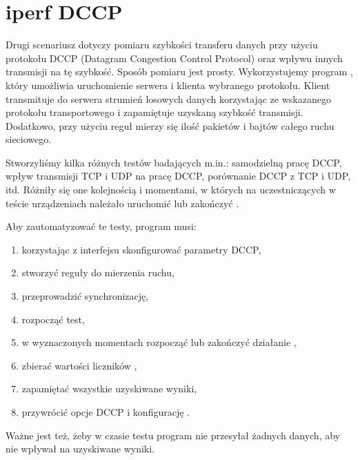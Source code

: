 \documentclass[00-praca-magisterska.tex]{subfiles}
\begin{document}

\section{iperf DCCP}


Drugi scenariusz dotyczy pomiaru szybkości transferu danych przy użyciu
protokołu DCCP (Datagram Congestion Control Protocol) oraz wpływu innych
transmisji na tę szybkość. Sposób pomiaru jest prosty. Wykorzystujemy program
, który umożliwia uruchomienie serwera i klienta wybranego
protokołu. Klient transmituje do serwera strumień losowych danych korzystając
ze wskazanego protokołu transportowego i zapamiętuje uzyskaną szybkość
transmisji. Dodatkowo, przy użyciu reguł  mierzy się ilość
pakietów i bajtów całego ruchu sieciowego.

Stworzyliśmy kilka różnych testów badających m.in.: samodzielną pracę DCCP,
wpływ transmisji TCP i UDP na pracę DCCP, porównanie DCCP z TCP i UDP, itd.
Różniły się one kolejnością i momentami, w których na uczestniczących w teście
urządzeniach należało uruchomić lub zakończyć .

Aby zautomatyzować te testy, program musi:
\begin{enumerate}
\item korzystając z interfejsu  skonfigurować parametry DCCP,
\item stworzyć reguły  do mierzenia ruchu,
\item przeprowadzić synchronizację, 
\item rozpocząć test,
\item w wyznaczonych momentach rozpocząć lub zakończyć działanie ,
\item zbierać wartości liczników ,
\item zapamiętać wszystkie uzyskiwane wyniki,
\item przywrócić opcje DCCP i konfigurację .
\end{enumerate}

Ważne jest też, żeby w czasie testu program nie przesyłał żadnych danych, aby
nie wpływał na uzyskiwane wyniki.
\end{document}
